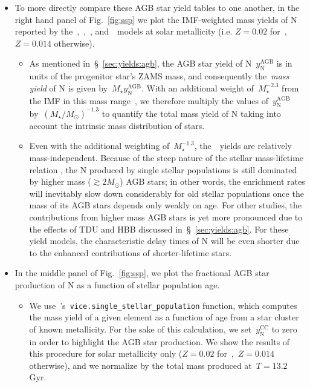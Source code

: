 \documentclass[ms.tex]{subfiles}
\begin{document}
\begin{itemize} 
	\item To more directly compare these AGB star yield tables to one another, 
	in the right hand panel of Fig.~\ref{fig:ssp} we plot the IMF-weighted mass 
	yields of N reported by the~\cristallo,~\ventura,~\karakasten, 
	and~\karakas~models at solar metallicity (i.e. $Z = 0.02$ for~\karakasten, 
	$Z = 0.014$ otherwise). 
	\begin{itemize} 
		\item As mentioned in~\S~\ref{sec:yields:agb}, the AGB star yield of 
		N~$y_\text{N}^\text{AGB}$ is in units of the progenitor star's ZAMS 
		mass, and consequently the~\textit{mass yield} of N is given 
		by~$M_\star y_\text{N}^\text{AGB}$. 
		With an additional weight of~$M_\star^{-2.3}$ from the IMF in this 
		mass range~\citep{Kroupa2001}, we therefore multiply the values 
		of~$y_\text{N}^\text{AGB}$ by~$(M_\star/M_\odot)^{-1.3}$ to quantify 
		the total mass yield of N taking into account the intrinsic mass 
		distribution of stars. 

		\item Even with the additional weighting of~$M_\star^{-1.3}$, 
		the~\cristallo~yields are relatively mass-independent. 
		Because of the steep nature of the stellar mass-lifetime relation 
		\citep[e.g.][]{Larson1974, Maeder1989, Padovani1993, Hurley2000}, the 
		N produced by single stellar populations is still dominated by higher 
		mass ($\gtrsim 2 M_\odot$) AGB stars; in other words, the enrichment 
		rates will inevitably slow down considerably for old stellar 
		populations once the mass of its AGB stars depends only weakly on age. 
		For other studies, the contributions from higher mass AGB stars is yet 
		more pronounced due to the effects of TDU and HBB discussed 
		in~\S~\ref{sec:yields:agb}. 
		For these yield models, the characteristic delay times of N will be 
		even shorter due to the enhanced contributions of shorter-lifetime 
		stars. 
	\end{itemize} 

	\item In the middle panel of Fig.~\ref{fig:ssp}, we plot the fractional AGB 
	star production of N as a function of stellar population age. 
	\begin{itemize} 
		\item We use~\vice's~\texttt{vice.single\_stellar\_population} 
		function, which computes the mass yield of a given element as a 
		function of age from a star cluster of known metallicity. 
		For the sake of this calculation, we set~$y_\text{N}^\text{CC}$ 
		to zero in order to highlight the AGB star production. 
		We show the results of this procedure for solar metallicity only 
		($Z = 0.02$ for~\karakasten,~$Z = 0.014$ otherwise), and we normalize 
		by the total mass produced at~$T = 13.2$ Gyr. 


\end{itemize}
\end{itemize}
\end{document}
